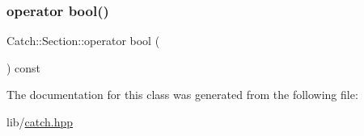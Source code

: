 \subsubsection{\texorpdfstring{operator bool()}{operator bool()}}
{\footnotesize\ttfamily Catch\+::\+Section\+::operator bool (\begin{DoxyParamCaption}{ }\end{DoxyParamCaption}) const}



The documentation for this class was generated from the following file\+:\begin{DoxyCompactItemize}
\item 
lib/\hyperlink{catch_8hpp}{catch.\+hpp}\end{DoxyCompactItemize}
